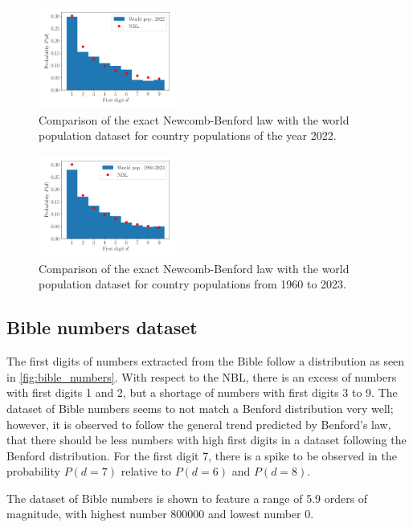 \documentclass[a4paper,10pt, twocolumn]{article}
\begin{document}
\begin{figure}[h]
	\centering
	\includegraphics[width=0.4\textwidth]{figures/pop_2022.pdf}
	\caption{Comparison of the exact Newcomb-Benford law with the world population dataset for country populations of the year 2022.}
	\label{fig:pop_2022}
\end{figure}

\begin{figure}[h]
	\centering
	\includegraphics[width=0.4\textwidth]{figures/pop_1960_2023.pdf}
	\caption{Comparison of the exact Newcomb-Benford law with the world population dataset for country populations from 1960 to 2023.}
	\label{fig:pop_1960_2023}
\end{figure}

\subsection{Bible numbers dataset}
The first digits of numbers extracted from the Bible follow a distribution as seen in \cref{fig:bible_numbers}. With respect to the NBL, there is an excess of numbers with first digits 1 and 2, but a shortage of numbers with first digits 3 to 9. The dataset of Bible numbers seems to not match a Benford distribution very well; however, it is observed to follow the general trend predicted by Benford's law, that there should be less numbers with high first digits in a dataset following the Benford distribution. For the first digit 7, there is a spike to be observed in the probability $P(d=7)$ relative to $P(d=6)$ and $P(d=8)$.

The dataset of Bible numbers is shown to feature a range of 5.9 orders of magnitude, with highest number 800000 and lowest number 0.
\end{document}
